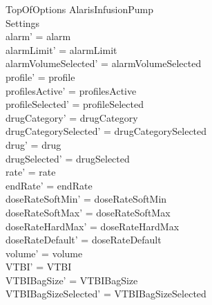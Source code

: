 \begin{schema}{TopOfOptions}
	\Delta AlarisInfusionPump\\
	 Settings\\
	\where
	alarm' = alarm\\
	alarmLimit' = alarmLimit\\
	\pagebreak
	alarmVolumeSelected' = alarmVolumeSelected\\
	profile' = profile\\
	profilesActive' = profilesActive\\  
	profileSelected' = profileSelected\\
	drugCategory' = drugCategory\\ 
	drugCategorySelected' = drugCategorySelected\\
	drug' = drug\\ 
	drugSelected' = drugSelected\\
	rate' = rate\\
	endRate' = endRate\\
	doseRateSoftMin' = doseRateSoftMin\\
	doseRateSoftMax' = doseRateSoftMax\\
	doseRateHardMax' = doseRateHardMax\\
	doseRateDefault' = doseRateDefault\\
	volume' = volume\\
	VTBI' = VTBI\\
	VTBIBagSize' = VTBIBagSize\\ VTBIBagSizeSelected' = VTBIBagSizeSelected\\

\end{schema}
